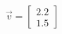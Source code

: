 \documentclass[preview]{standalone}
\begin{document}
\begin{align*}
\vec{v}=\begin{bmatrix}2.2\\1.5\end{bmatrix}
\end{align*}
\end{document}

